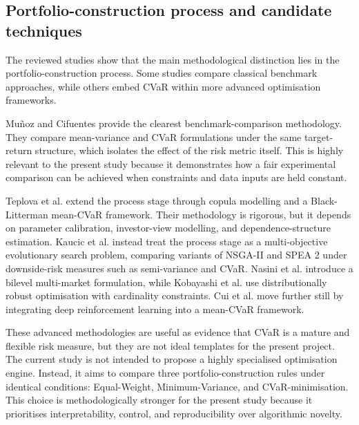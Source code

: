 \subsection{Portfolio-construction process and candidate techniques}
\label{subsec:lit-process}
\par The reviewed studies show that the main methodological distinction lies in the portfolio-construction process. Some studies compare classical benchmark approaches, while others embed CVaR within more advanced optimisation frameworks.
\par Muñoz and Cifuentes \cite{munoz2026riskmetrics} provide the clearest benchmark-comparison methodology. They compare mean-variance and CVaR formulations under the same target-return structure, which isolates the effect of the risk metric itself. This is highly relevant to the present study because it demonstrates how a fair experimental comparison can be achieved when constraints and data inputs are held constant.
\par Teplova et al. \cite{teplova2023blcopula} extend the process stage through copula modelling and a Black-Litterman mean-CVaR framework. Their methodology is rigorous, but it depends on parameter calibration, investor-view modelling, and dependence-structure estimation. Kaucic et al. \cite{kaucic2019riskmeasures} instead treat the process stage as a multi-objective evolutionary search problem, comparing variants of NSGA-II and SPEA 2 under downside-risk measures such as semi-variance and CVaR. Nasini et al. \cite{nasini2022multimarket} introduce a bilevel multi-market formulation, while Kobayashi et al. \cite{kobayashi2023cardinalitydro} use distributionally robust optimisation with cardinality constraints. Cui et al. \cite{cui2023cvarrlcrypto} move further still by integrating deep reinforcement learning into a mean-CVaR framework.
\par These advanced methodologies are useful as evidence that CVaR is a mature and flexible risk measure, but they are not ideal templates for the present project. The current study is not intended to propose a highly specialised optimisation engine. Instead, it aims to compare three portfolio-construction rules under identical conditions: Equal-Weight, Minimum-Variance, and CVaR-minimisation. This choice is methodologically stronger for the present study because it prioritises interpretability, control, and reproducibility over algorithmic novelty.

